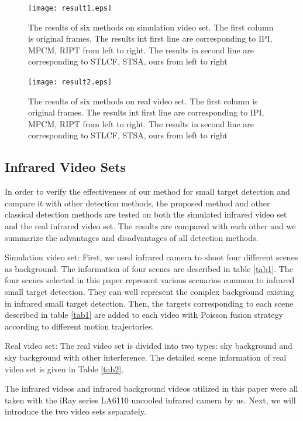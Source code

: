 \documentclass[journal]{IEEEtran}
\begin{document}
\newenvironment{figurehere}
{\def\@captype{figure}}
{}

\begin{figure}
  \centering
  \texttt{[image: result1.eps]}
  \caption{The results of six methods on simulation video set. The first column is original frames. The results int first line are corresponding to IPI, MPCM, RIPT from left to right. The results in second line are corresponding to STLCF, STSA, ours from left to right}
  \label{result1}
\end{figure}

\begin{figure}
  \centering
  \texttt{[image: result2.eps]}
  \caption{The results of six methods on real video set. The first column is original frames. The results int first line are corresponding to IPI, MPCM, RIPT from left to right. The results in second line are corresponding to STLCF, STSA, ours from left to right}
  \label{result2}
\end{figure}

\subsection{Infrared Video Sets}
In order to verify the effectiveness of our method for small target detection and compare it with other detection methods, the proposed method and other classical detection methods are tested on both the simulated infrared video set and the real infrared video set. The results are compared with each other and we summarize the advantages and disadvantages of all detection methods.

Simulation video set: First, we used infrared camera to shoot four different scenes as background. The information of four scenes are described in table \ref{tab1}. The four scenes selected in this paper represent various scenarios common to infrared small target detection. They can well represent the complex background existing in infrared small target detection. Then, the targets corresponding to each scene described in table \ref{tab1} are added to each video with Poisson fusion strategy\cite{perez2003poisson} according to different motion trajectories.

Real video set: The real video set is divided into two types: sky background and sky background with other interference. The detailed scene information of real video set is given in Table \ref{tab2}.

The infrared videos and infrared background videos utilized in this paper were all taken with the iRay series LA6110 uncooled infrared camera by us. Next, we will introduce the two video sets separately.
\end{document}
